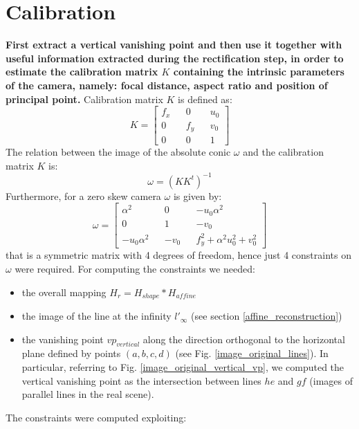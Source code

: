 \documentclass[11pt, oneside]{article}
\begin{document}
\section{Calibration}
\textbf{First extract a vertical vanishing point and then use it together with useful information extracted during the rectification step, in order to estimate the calibration matrix $K$ containing the intrinsic parameters of the camera, namely: focal distance, aspect ratio and position of principal point.} \hfill \break
Calibration matrix $K$ is defined as:
\begin{equation} \label{keq}
	K =
	\begin{bmatrix}
		f_x  && 0 && u_0 \\ 0 && f_y && v_0 \\ 0 && 0 && 1
	\end{bmatrix}
\end{equation}
The relation between the image of the absolute conic $\omega$ and the calibration matrix $K$ is:
\begin{equation}
	\label{eqn:omega_K}
	\omega = (KK^t)^{-1}
\end{equation}
Furthermore, for a zero skew camera $\omega$ is given by:
\begin{equation}
	\label{eqn:omega}
	\omega = 
	\begin{bmatrix}
		\alpha^2 && 0 && -u_0 \alpha^2 \\ 0 && 1 && -v_0 \\  -u_0 \alpha^2 && -v_0 && f_y^2 +\alpha^2 u_0^2 + v_0^2
	\end{bmatrix}
\end{equation}
that is a symmetric matrix with 4 degrees of freedom, hence just 4 constraints on $\omega$ were required. For computing the constraints we needed:
\begin{itemize}
	\item the overall mapping $ H_{r} = H_{shape} * H_{affine} $
	\item the image of the line at the infinity $l'_\infty$ (see section \ref{affine_reconstruction})
	\item the vanishing point $vp_{vertical}$ along the direction orthogonal to the horizontal plane defined by points $(a, b, c, d)$ (see Fig. \ref{image_original_lines}). In particular, referring to Fig. \ref{image_original_vertical_vp}, we computed the vertical vanishing point as the intersection between lines $he$ and $gf$ (images of parallel lines in the real scene). 
\end{itemize}
The constraints were computed exploiting:
\end{document}
